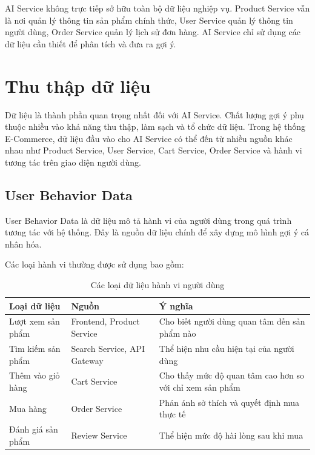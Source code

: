\documentclass[../main.tex]{subfiles}
\begin{document}
AI Service không trực tiếp sở hữu toàn bộ dữ liệu nghiệp vụ. Product Service vẫn là nơi quản lý thông tin sản phẩm chính thức, User Service quản lý thông tin người dùng, Order Service quản lý lịch sử đơn hàng. AI Service chỉ sử dụng các dữ liệu cần thiết để phân tích và đưa ra gợi ý.

\section{Thu thập dữ liệu}

Dữ liệu là thành phần quan trọng nhất đối với AI Service. Chất lượng gợi ý phụ thuộc nhiều vào khả năng thu thập, làm sạch và tổ chức dữ liệu. Trong hệ thống E-Commerce, dữ liệu đầu vào cho AI Service có thể đến từ nhiều nguồn khác nhau như Product Service, User Service, Cart Service, Order Service và hành vi tương tác trên giao diện người dùng.

\subsection{User Behavior Data}

User Behavior Data là dữ liệu mô tả hành vi của người dùng trong quá trình tương tác với hệ thống. Đây là nguồn dữ liệu chính để xây dựng mô hình gợi ý cá nhân hóa.

Các loại hành vi thường được sử dụng bao gồm:

\begin{table}[H]
    \centering
    \caption{Các loại dữ liệu hành vi người dùng}
    \label{tab:chapter3-user-behavior-data}
    \begin{tabular}{|p{}|p{}|p{}|}
        \hline
        \rowcolor{primary!35}
        \textbf{Loại dữ liệu} & \textbf{Nguồn} & \textbf{Ý nghĩa} \\
\hline
Lượt xem sản phẩm & Frontend, Product Service & Cho biết người dùng quan tâm đến sản phẩm nào \\
\hline
Tìm kiếm sản phẩm & Search Service, API Gateway & Thể hiện nhu cầu hiện tại của người dùng \\
\hline
Thêm vào giỏ hàng & Cart Service & Cho thấy mức độ quan tâm cao hơn so với chỉ xem sản phẩm \\
\hline
Mua hàng & Order Service & Phản ánh sở thích và quyết định mua thực tế \\
\hline
Đánh giá sản phẩm & Review Service & Thể hiện mức độ hài lòng sau khi mua \\
\hline
\end{tabular}
\end{table}
\end{document}
